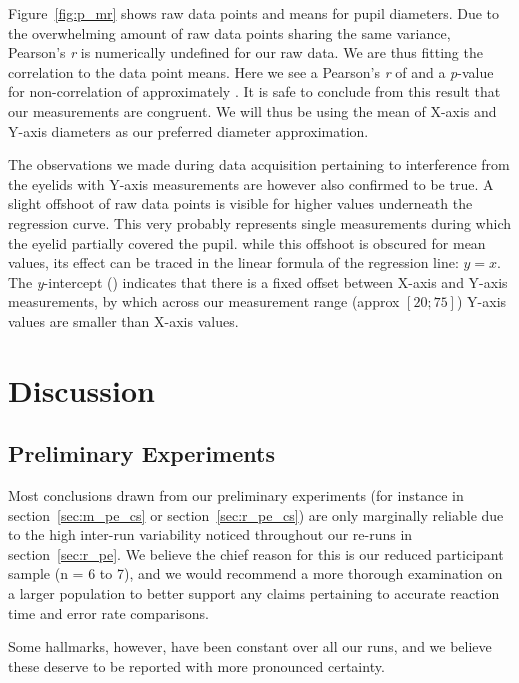 	    Figure~\ref{fig:p_mr} shows raw data points and means for pupil diameters.
	    Due to the overwhelming amount of raw data points sharing the same variance, Pearson's \textit{r} is numerically undefined for our raw data.
	    We are thus fitting the correlation to the data point means. 
	    Here we see a Pearson's \textit{r} of  and a \textit{p}-value for non-correlation of approximately .
	    It is safe to conclude from this result that our measurements are congruent.
	    We will thus be using the mean of X-axis and Y-axis diameters as our preferred diameter approximation.
	    
	    The observations we made during data acquisition pertaining to interference from the eyelids with Y-axis measurements are however also confirmed to be true.
	    A slight offshoot of raw data points is visible for higher values underneath the regression curve.
	    This very probably represents single measurements during which the eyelid partially covered the pupil.  
	    while this offshoot is obscured for mean values, its effect can be traced in the linear formula of the regression line: 
	    $y = $$x$.
	    The \textit{y}-intercept () indicates that there is a fixed offset between X-axis and Y-axis measurements, by which across our measurement range (approx $[20;75]$) Y-axis values are smaller than X-axis values.
\chapter{Discussion}
    \section{Preliminary Experiments}\label{sec:d_pe}
	Most conclusions drawn from our preliminary experiments (for instance in section~\ref{sec:m_pe_cs} or section~\ref{sec:r_pe_cs}) are only marginally reliable due to the high inter-run variability noticed throughout our re-runs in section~\ref{sec:r_pe}.
	We believe the chief reason for this is our reduced participant sample (n = 6 to 7), and we would recommend a more thorough examination on a larger population to better support any claims pertaining to accurate reaction time and error rate comparisons.
	
	Some hallmarks, however, have been constant over all our runs, and we believe these deserve to be reported with more pronounced certainty.

